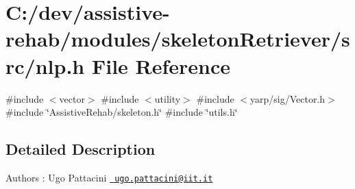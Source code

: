 \section{C\+:/dev/assistive-\/rehab/modules/skeleton\+Retriever/src/nlp.h File Reference}
\label{nlp_8h}
{\ttfamily \#include $<$vector$>$}\newline
{\ttfamily \#include $<$utility$>$}\newline
{\ttfamily \#include $<$yarp/sig/\+Vector.\+h$>$}\newline
{\ttfamily \#include \char`\"{}Assistive\+Rehab/skeleton.\+h\char`\"{}}\newline
{\ttfamily \#include \char`\"{}utils.\+h\char`\"{}}\newline


\subsection{Detailed Description}
\begin{DoxyAuthor}{Authors}
\+: Ugo Pattacini \href{mailto:ugo.pattacini@iit.it}{\texttt{ ugo.\+pattacini@iit.\+it}} 
\end{DoxyAuthor}
